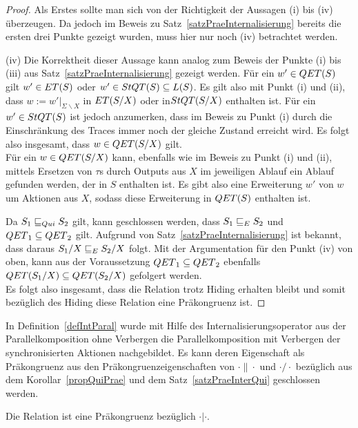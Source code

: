 \begin{proof}
  Als Erstes sollte man sich von der Richtigkeit der Aussagen (i) bis (iv)
  überzeugen. Da jedoch im Beweis zu Satz~\ref{satzPraeInternalisierung}
  bereits die ersten drei Punkte gezeigt wurden, muss hier nur noch (iv)
  betrachtet werden.

  (iv)
  Die Korrektheit dieser Aussage kann analog zum Beweis der Punkte (i) bis
  (iii) aus Satz~\ref{satzPraeInternalisierung} gezeigt werden. Für ein $w'\in
  QET{}(S)$ gilt $w'\in ET{}(S)$ oder $w'\in StQT{}(S)\subseteq L(S)$.
  Es gilt also mit Punkt (i) und (ii), dass $w:=w'|_{\Sigma\backslash X}$ in
  $ET{}(S/X)$ oder in\linebreak $StQT{}(S/X)$ enthalten ist. Für ein $w'\in StQT{}(S)$
  ist jedoch anzumerken, dass im Beweis zu Punkt (i) durch die Einschränkung
  des Traces immer noch der gleiche Zustand erreicht wird. Es folgt also
  insgesamt, dass $w\in QET{}(S/X)$ gilt.\\
  Für ein $w\in QET{}(S/X)$ kann, ebenfalls wie im Beweis zu Punkt (i) und
  (ii),
  mittels Ersetzen von $\tau$s durch Outputs aus $X$ im jeweiligen Ablauf ein
  Ablauf gefunden werden,
  der in $S$ enthalten ist. Es gibt also eine Erweiterung $w'$ von $w$ um
  Aktionen aus $X$, sodass diese Erweiterung in $QET{}(S)$ enthalten ist.

  Da $S_1\sqsubseteq _{Qui} S_2$ gilt, kann geschlossen werden, dass $S_1\sqsubseteq _E S_2$ und
  $QET{}_1\subseteq QET{}_2$ gilt. Aufgrund von
  Satz~\ref{satzPraeInternalisierung} ist bekannt, dass daraus $S_1/X\sqsubseteq _E
  S_2/X$ folgt. Mit der Argumentation für den Punkt (iv) von oben, kann aus der
  Voraussetzung $QET{}_1\subseteq QET{}_2$ ebenfalls $QET{}(S_1/X)\subseteq
  QET{}(S_2/X)$ gefolgert werden.\\
  Es folgt also insgesamt, dass die Relation \QRel{} trotz Hiding erhalten
  bleibt und somit bezüglich des Hiding diese Relation eine Präkongruenz ist.
\end{proof}

In Definition~\ref{defIntParal} wurde mit Hilfe des Internalisierungsoperator
aus der Parallelkomposition ohne Verbergen die Parallelkomposition mit
Verbergen der synchronisierten Aktionen nachgebildet. Es kann deren
Eigenschaft als Präkongruenz aus den Präkongruenz\-eigenschaften von
$\cdot\|\cdot$ und $\cdot /\cdot$ bezüglich \QRel{} aus dem
Korollar~\ref{propQuiPrae} und dem Satz~\ref{satzPraeInterQui} geschlossen
werden.

\begin{kor}
  Die Relation \QRel{} ist eine Präkongruenz bezüglich $\cdot |\cdot$.
\end{kor}
